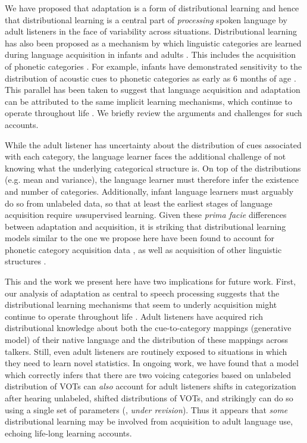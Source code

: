 We have proposed that adaptation is a form of distributional learning and hence that distributional learning is a central part of \emph{processing} spoken language by adult listeners in the face of variability across situations. Distributional learning has also been proposed as a mechanism by which linguistic categories are learned during language acquisition in infants \autocite[e.g.,][]{Aslin1998,Gomez2000,Saffran1996,Wonnacott2008} and adults \autocite[e.g.,][]{Pajak2011,Saffran1996a}. This includes the acquisition of phonetic categories \autocite[e.g.,][]{McMurray2009,Toscano2010,Vallabha2007}.
For example, infants have demonstrated sensitivity to the distribution of acoustic cues to phonetic categories as early as 6 months of age \autocite{Maye2002}. 
This parallel has been taken to suggest that language acquisition and adaptation can be attributed to the same implicit learning mechanisms, which continue to operate throughout life \autocite[e.g.,][]{Botvinick2004,Chang2006,Elman1990}. We briefly review the arguments and challenges for such accounts.

While the adult listener has uncertainty about the distribution of cues associated with each category, the language learner faces the additional challenge of not knowing what the underlying categorical structure is.  On top of the distributions (e.g. mean and variance), the language learner must therefore infer the existence and number of categories. Additionally, infant language learners must arguably do so from unlabeled data, so that at least the earliest stages of language acquisition require {\em un}supervised learning. Given these {\em prima facie} differences between adaptation and acquisition, it is striking that distributional learning models similar to the one we propose here have been found to account for phonetic category acquisition data \autocite{Feldman2013a,McMurray2009,Vallabha2007}, as well as acquisition of other linguistic structures \autocite{Frank2009a,Odonnell2011}.

This and the work we present here have two implications for future work.  First, our analysis of adaptation as central to speech processing suggests that the distributional learning mechanisms that seem to underly acquisition might continue to operate throughout life \autocite[as also proposed in][]{Botvinick2004,Chang2006,Elman1990}.  Adult listeners have acquired rich distributional knowledge about both the cue-to-category mappings (generative model) of their native language and the distribution of these mappings across talkers. Still, even adult listeners are routinely exposed to situations in which they need to learn novel statistics.  In ongoing work, we have found that a model which correctly infers that there are two voicing categories based on unlabeled distribution of VOTs can \emph{also} account for adult listeners shifts in categorization after hearing unlabeled, shifted distributions of VOTs, and strikingly can do so using a single set of parameters (\citeauthor{ToscanoSubmitted}, \emph{under revision}).  Thus it appears that \emph{some} distributional learning may be involved from acquisition to adult language use,
echoing life-long learning accounts.

